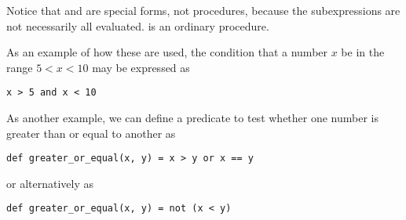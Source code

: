 Notice that  and  are special forms, not procedures, because the subexpressions are not necessarily all evaluated.  is an ordinary procedure.

As an example of how these are used, the condition that a number $x$ be in the range $5 < x < 10$ may be expressed as

\begin{lstlisting}
x > 5 and x < 10
\end{lstlisting}

As another example, we can define a predicate to test whether one number is greater than or equal to another as

\begin{lstlisting}
def greater_or_equal(x, y) = x > y or x == y
\end{lstlisting}

or alternatively as

\begin{lstlisting}
def greater_or_equal(x, y) = not (x < y)
\end{lstlisting}

